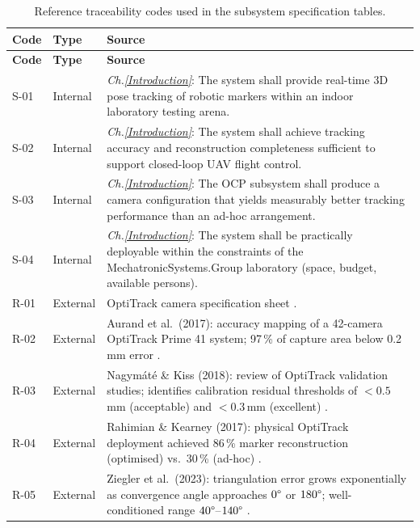 {\small\setlength{\tabcolsep}{4pt}
\begin{longtable}{p{1.0cm} p{1.5cm} >{\raggedright\arraybackslash}p{\dimexpr\linewidth-1.0cm-1.5cm-6\tabcolsep\relax}}
\caption{Reference traceability codes used in the subsystem specification tables.}
\label{tab:trace-refs}\\
\toprule
\textbf{Code} & \textbf{Type} & \textbf{Source} \\
\midrule
\endfirsthead
\toprule
\textbf{Code} & \textbf{Type} & \textbf{Source} \\
\midrule
\endhead
\bottomrule
\endlastfoot
S-01 & Internal & \textit{Ch.\ref{Introduction}}: The system shall provide real-time 3D pose tracking of robotic markers within an indoor laboratory testing arena. \\[4pt]
S-02 & Internal & \textit{Ch.\ref{Introduction}}: The system shall achieve tracking accuracy and reconstruction completeness sufficient to support closed-loop \gls{UAV} flight control. \\[4pt]
S-03 & Internal & \textit{Ch.\ref{Introduction}}: The \gls{OCP} subsystem shall produce a camera configuration that yields measurably better tracking performance than an ad-hoc arrangement. \\[4pt]
S-04 & Internal & \textit{Ch.\ref{Introduction}}: The system shall be practically deployable within the constraints of the MechatronicSystems.Group laboratory (space, budget, available persons). \\[4pt]
R-01 & External & OptiTrack camera specification sheet \parencite{OptiTrackDatasheet}. \\[4pt]
R-02 & External & Aurand et al.\ (2017): accuracy mapping of a 42-camera OptiTrack Prime 41 system; 97\,\% of capture area below 0.2\,mm error \parencite{aurandAccuracyMapOptical2017}. \\[4pt]
R-03 & External & Nagymát{\'e} \& Kiss (2018): review of OptiTrack validation studies; identifies calibration residual thresholds of $<0.5$\,mm (acceptable) and $<0.3$\,mm (excellent) \parencite{nagymateMotionCaptureSystem2018}. \\[4pt]
R-04 & External & Rahimian \& Kearney (2017): physical OptiTrack deployment achieved 86\,\% marker reconstruction (optimised) vs.\ 30\,\% (ad-hoc) \parencite{rahimianOptimalCameraPlacement2017}. \\[4pt]
R-05 & External & Ziegler et al.\ (2023): triangulation error grows exponentially as convergence angle approaches $0\degree$ or $180\degree$; well-conditioned range $40\degree$--$140\degree$ \parencite{zieglerOptimalCameraPlacement2023}. \\
\end{longtable}}

